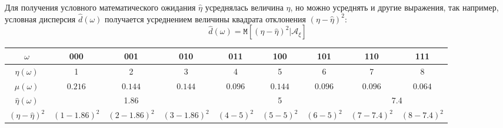 \documentclass[a4paper,12pt]{article}
\newcommand{\cexpectation}[2]{\texttt{M} \left[ #1 | #2 \right]}
\begin{document}
Для получения условного математического ожидания $\widehat{\eta}$ усреднялась величина $\eta$, но можно усреднять и другие
выражения, так например, условная дисперсия $\widehat{d}(\omega)$ получается усреднением величины квадрата отклонения $(\eta - \widehat{\eta})^2$:
\[
    \widehat{d}(\omega) = \cexpectation{(\eta - \widehat{\eta})^2}{\mathcal{A}_\xi}
\]

\begin{center}
    \begin{tabular}{|c|c|c|c|c|c|c|c|c|}
        \hline
        $\omega$                    & 000                                                                                                                           & 001                                                                                                  & 010                                                                                                   & 011       & 100       & 101       & 110         & 111         \\
        \hline
        $\eta(\omega)$              & 1                                                                                                                             & 2                                                                                                    & 3                                                                                                     & 4         & 5         & 6         & 7           & 8           \\
        \hline
        $\mu(\omega)$               & $0.216$                                                                                                                       & $0.144$                                                                                              & $0.144$                                                                                               & $0.096$   & $0.144$   & $0.096$   & $0.096$     & $0.064$     \\
        \hline
        $\widehat{\eta}(\omega)$    & \multicolumn{3}{|c|}{1.86}                                                                                                    & \multicolumn{3}{|c|}{5}                                                                              & \multicolumn{2}{|c|}{7.4}                                                                                                                                             \\
        \hline
        $(\eta - \widehat{\eta})^2$ & $(1-1.86)^2$                                                                                                                  & $(2-1.86)^2$                                                                                         & $(3-1.86)^2$                                                                                          & $(4-5)^2$ & $(5-5)^2$ & $(6-5)^2$ & $(7-7.4)^2$ & $(8-7.4)^2$ \\

\end{tabular}
\end{center}
\end{document}
